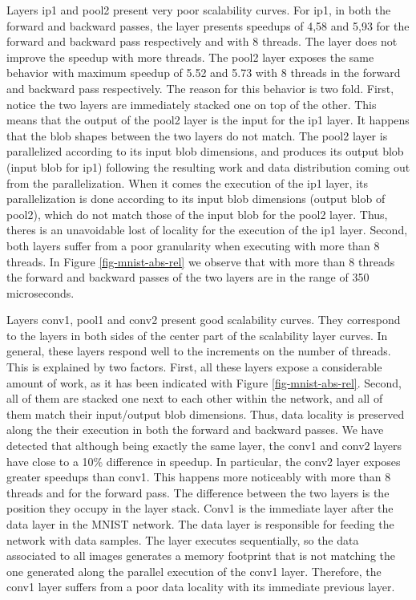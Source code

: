 Layers ip1 and pool2 present very poor scalability curves. 
For ip1, in both the forward and backward passes, the layer 
presents speedups of 4,58 and 5,93 for the forward and backward 
pass respectively and with 8 threads. The layer does not improve 
the speedup with more threads. The pool2 layer exposes the same 
behavior with maximum speedup of 5.52 and 5.73 with 8 threads in 
the forward and backward pass respectively. The reason for this 
behavior is two fold. First, notice the two layers are immediately 
stacked one on top of the other. This means that the 
output of the pool2 layer is the input for the ip1 layer. It happens 
that the blob shapes between the two layers do not match. The pool2 
layer is parallelized according to its input blob dimensions, and 
produces its output blob (input blob for ip1) following the resulting 
work and data distribution coming out from the parallelization. When 
it comes the execution of the ip1 layer, its parallelization is done 
according to its input blob dimensions (output blob of pool2), which do 
not match those of the input blob for the pool2 layer. Thus, theres is 
an unavoidable lost of locality for the execution of the ip1 layer. 
Second, both layers suffer from a poor granularity when executing with 
more than 8 threads. In Figure \ref{fig-mnist-abs-rel} we observe that 
with more than 8 threads the forward and backward passes of the two layers 
are in the range of 350 microseconds.

Layers conv1, pool1 and conv2 present good scalability curves. They 
correspond to the layers in both sides of the center part of the 
scalability layer curves. In general, these layers respond well to the 
increments on the number of threads. This is explained by two factors. 
First, all these layers expose a considerable amount of work, as it has 
been indicated with Figure \ref{fig-mnist-abs-rel}. Second, all of them 
are stacked one next to each other within the network, and all of them 
match their input/output blob dimensions. Thus, data locality is 
preserved along the their execution in both the forward and backward passes.
We have detected that although being exactly the same layer, the conv1 
and conv2 layers have close to a 10\% difference in speedup. 
In particular, the conv2 layer exposes greater speedups than conv1. 
This happens more noticeably with more than 8 threads and for the 
forward pass. The difference between the two layers is the position 
they occupy in the layer stack. Conv1 is the immediate layer after the 
data layer in the MNIST network. The data layer is responsible for
feeding the network with data samples. The layer executes sequentially, 
so the data associated to all images generates a memory footprint that is 
not matching the one generated along the parallel execution of the 
conv1 layer. Therefore, the conv1 layer suffers from a poor data 
locality with its immediate previous layer.

